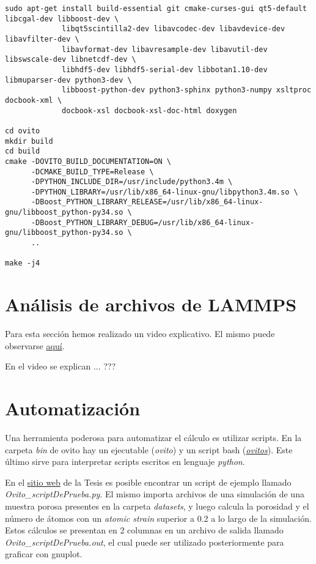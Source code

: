 \begin{lstlisting}
sudo apt-get install build-essential git cmake-curses-gui qt5-default libcgal-dev libboost-dev \
		     libqt5scintilla2-dev libavcodec-dev libavdevice-dev libavfilter-dev \
		     libavformat-dev libavresample-dev libavutil-dev libswscale-dev libnetcdf-dev \
		     libhdf5-dev libhdf5-serial-dev libbotan1.10-dev libmuparser-dev python3-dev \
		     libboost-python-dev python3-sphinx python3-numpy xsltproc docbook-xml \
		     docbook-xsl docbook-xsl-doc-html doxygen
                     
cd ovito
mkdir build
cd build
cmake -DOVITO_BUILD_DOCUMENTATION=ON \
      -DCMAKE_BUILD_TYPE=Release \
      -DPYTHON_INCLUDE_DIR=/usr/include/python3.4m \
      -DPYTHON_LIBRARY=/usr/lib/x86_64-linux-gnu/libpython3.4m.so \
      -DBoost_PYTHON_LIBRARY_RELEASE=/usr/lib/x86_64-linux-gnu/libboost_python-py34.so \
      -DBoost_PYTHON_LIBRARY_DEBUG=/usr/lib/x86_64-linux-gnu/libboost_python-py34.so \
      ..
      
make -j4
\end{lstlisting}

\section{Análisis de archivos de LAMMPS}
\label{AB_2}

Para esta sección hemos realizado un video explicativo. El mismo puede observarse \href{https://youtu.be/iGieWcpcQmQ}{aquí}.

En el video se explican ... ???

\section{Automatización}
\label{AB_3}

Una herramienta poderosa para automatizar el cálculo es utilizar scripts. En la carpeta \textit{bin} de ovito hay un ejecutable (\textit{ovito}) y un script bash (\textit{\href{http://www.ovito.org/manual/python/introduction/running.html}{ovitos}}). Este último sirve para interpretar scripts escritos en lenguaje \textit{python}. 

En el \href{https://github.com/francoa/Tesis/tree/master/Resources}{sitio web} de la Tesis es posible encontrar un script de ejemplo llamado \textit{Ovito\_scriptDePrueba.py}. El mismo importa archivos de una simulación de una muestra porosa presentes en la carpeta \textit{datasets}, y luego calcula la porosidad y el número de átomos con un \textit{atomic strain} superior a 0.2 a lo largo de la simulación. Estos cálculos se presentan en 2 columnas en un archivo de salida llamado \textit{Ovito\_scriptDePrueba.out}, el cual puede ser utilizado posteriormente para graficar con gnuplot.

